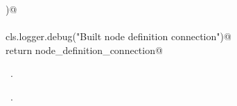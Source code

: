\documentclass[
    a4paper,      %
    10pt,         %
    openright,    %
    notitlepage,  %
    parskip=half, %
]{scrreprt}       %
\theoremstyle{definition}                    %
\begin{document}
\begin{flushleft}
\begin{minipage}{\linewidth}
\begin{list}{}{}
\mbox{}\lstinline@    )@\\
\mbox{}\lstinline@@\\
\mbox{}\lstinline@    cls.logger.debug("Built node definition connection")@\\
\mbox{}\lstinline@    return node_definition_connection@\\
\mbox{}\lstinline@@{\NWsep}
\end{list}
\vspace{-1.5ex}
\footnotesize
\begin{list}{}{\setlength{\itemsep}{-\parsep}\setlength{\itemindent}{-\leftmargin}}
\item \NWtxtMacroDefBy\ .
\item \NWtxtMacroRefIn\ .

\item{}
\end{list}
\end{minipage}\vspace{4ex}
\end{flushleft}
\end{document}
